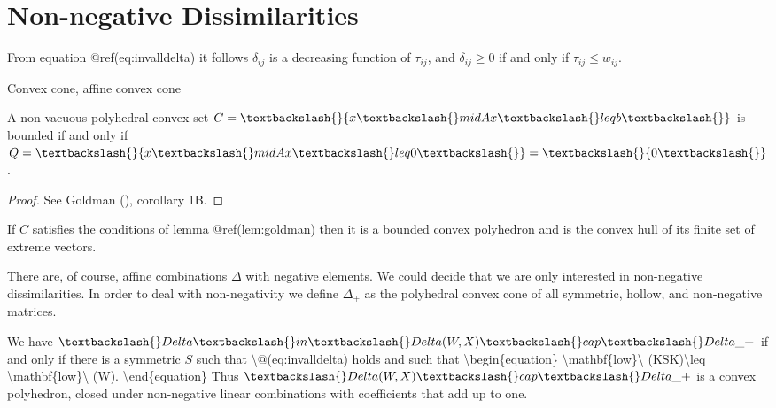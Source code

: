 \documentclass[
  12pt,
  letterpaper,
  DIV=11,
  numbers=noendperiod]{scrreprt}
\newenvironment{Shaded}{\begin{snugshade}}{\end{snugshade}}
\newcommand{\NormalTok}[1]{\textcolor[rgb]{0.00,0.23,0.31}{#1}}
\theoremstyle{remark}
\begin{document}
\section{Non-negative
Dissimilarities}\label{non-negative-dissimilarities}

From equation @ref(eq:invalldelta) it follows \(\delta_{ij}\) is a
decreasing function of \(\tau_{ij}\), and \(\delta_{ij}\geq 0\) if and
only if \(\tau_{ij}\leq w_{ij}\).

Convex cone, affine convex cone

\begin{Shaded}
\begin{Highlighting}[]
\NormalTok{A non{-}vacuous polyhedral convex set $C=\textbackslash{}\{x\textbackslash{}mid Ax\textbackslash{}leq b\textbackslash{}\}$ is bounded if and only if $Q=\textbackslash{}\{x\textbackslash{}mid Ax\textbackslash{}leq 0\textbackslash{}\}=\textbackslash{}\{0\textbackslash{}\}$. }
\end{Highlighting}
\end{Shaded}

\begin{proof}
See Goldman (), corollary 1B.
\end{proof}

If \(C\) satisfies the conditions of lemma @ref(lem:goldman) then it is
a bounded convex polyhedron and is the convex hull of its finite set of
extreme vectors.

There are, of course, affine combinations \(\Delta\) with negative
elements. We could decide that we are only interested in non-negative
dissimilarities. In order to deal with non-negativity we define
\(\Delta_+\) as the polyhedral convex cone of all symmetric, hollow, and
non-negative matrices.

\begin{Shaded}
\begin{Highlighting}[]
\NormalTok{We have $\textbackslash{}Delta\textbackslash{}in\textbackslash{}Delta(W,X)\textbackslash{}cap\textbackslash{}Delta\_+$ if and only if there is a symmetric $S$ such that \textbackslash{}@(eq:invalldelta) holds and such that }
\NormalTok{\textbackslash{}begin\{equation\}}
\NormalTok{\textbackslash{}mathbf\{low\}\textbackslash{} (KSK\textquotesingle{})\textbackslash{}leq \textbackslash{}mathbf\{low\}\textbackslash{} (W).}
\NormalTok{\textbackslash{}end\{equation\}}
\NormalTok{Thus $\textbackslash{}Delta(W,X)\textbackslash{}cap\textbackslash{}Delta\_+$ is a convex polyhedron, closed under non{-}negative linear combinations with coefficients that add up to one.}
\end{Highlighting}
\end{Shaded}
\end{document}
